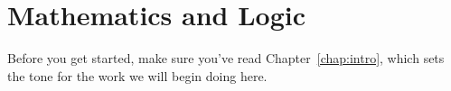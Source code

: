 \chapter{Mathematics and Logic}

Before you get started, make sure you've read Chapter~\ref{chap:intro}, which sets the tone for the work we will begin doing here.